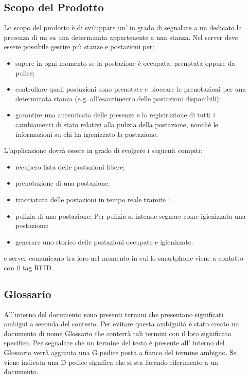 \subsection{Scopo del Prodotto}
Lo scopo del prodotto è di sviluppare un’ in grado di
segnalare a un  dedicato la presenza di un  su una determinata  appartenente a
una stanza. 
Nel server deve essere possibile gestire più stanze e postazioni per:
\begin{itemize}
\item{sapere in ogni momento se la postazione è occupata, prenotata oppure da pulire;}
\item{controllare quali postazioni sono prenotate e bloccare le prenotazioni per una determinata
stanza (e.g. all'esaurimento delle postazioni disponibili);}
\item{garantire una  autenticata delle presenze e la registrazione di tutti i cambiamenti di stato relativi alla pulizia della
postazione, nonché le informazioni su chi ha igienizzato la postazione.}
\end{itemize}
L'applicazione dovrà essere in grado di svolgere i seguenti compiti:
\begin{itemize}
\item{recupero lista delle postazioni libere;}
\item{prenotazione di una postazione;}
\item{tracciatura delle postazioni in tempo reale tramite  ;}
\item{pulizia di una postazione; Per pulizia si intende segnare come igienizzata una postazione;}
\item{generare uno storico delle postazioni occupate e igienizzate.}
\end{itemize}
 e server comunicano tra loro nel momento in cui lo smartphone viene  a contatto con il tag RFID.

\subsection{Glossario}
All’interno del  documento sono presenti termini che presentano significati ambigui a seconda del contesto.
Per evitare questa ambiguità è stato creato un  documento di nome Glossario che  conterrà tali termini con il loro significato specifico. Per segnalare che un termine del testo è presente all’ interno del Glossario  
verrà aggiunta una G pedice posta a fianco del termine ambiguo. 
Se viene indicata una D pedice significa che si sta facendo riferimento a un documento.

